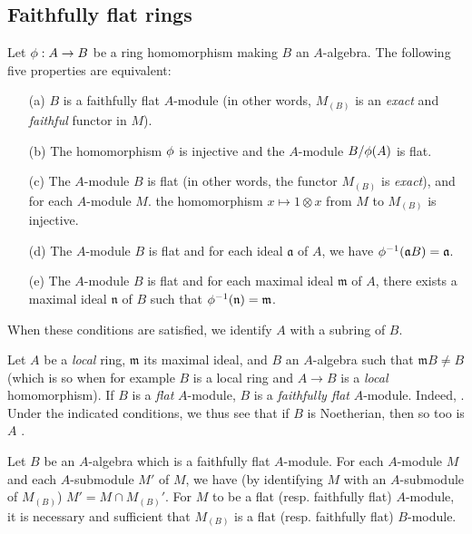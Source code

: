 \subsection{Faithfully flat rings}
\label{subsection:0.6.6}

\begin{env}[6.6.1]
\label{0.6.6.1}
Let $\vphi:A\to B$ be a ring homomorphism making $B$ an $A$-algebra. The following five
properties are equivalent:
\begin{enumerate}
  \item[(a)] $B$ is a faithfully flat $A$-module (in other words, $M_{(B)}$ is an \emph{exact}
    and \emph{faithful} functor in $M$).
  \item[(b)] The homomorphism $\phi$ is injective and the $A$-module $B/\phi(A)$ is flat.
  \item[(c)] The $A$-module $B$ is flat (in other words, the functor $M_{(B)}$ is \emph{exact}),
    and for each $A$-module $M$. the homomorphism $x\mapsto 1\otimes x$ from $M$ to $M_{(B)}$ is
    injective.
  \item[(d)] The $A$-module $B$ is flat and for each ideal $\mathfrak{a}$ of $A$, we have
    $\phi^{-1}(\mathfrak{a}B)=\mathfrak{a}$.
  \item[(e)] The $A$-module $B$ is flat and for each maximal ideal $\mathfrak{m}$ of $A$, there
    exists a maximal ideal $\mathfrak{n}$ of $B$ such that $\phi^{-1}(\mathfrak{n})=\mathfrak{m}$.
\end{enumerate}

When these conditions are satisfied, we identify $A$ with a subring of $B$.
\end{env}

\begin{env}[6.6.2]
\label{0.6.6.2}
Let $A$ be a \emph{local} ring, $\mathfrak{m}$ its maximal ideal, and $B$ an $A$-algebra such
that $\mathfrak{m}B\neq B$ (which is so when for example $B$ is a local ring and $A\to B$ is
a \emph{local} homomorphism). If $B$ is a \emph{flat} $A$-module, $B$ is a \emph{faithfully
flat} $A$-module.
Indeed, .
Under the indicated conditions, we thus see that if $B$ is Noetherian, then so too is $A$ .
\end{env}

\begin{env}[6.6.3]
\label{0.6.6.3}
Let $B$ be an $A$-algebra which is a faithfully flat $A$-module. For each $A$-module $M$ and
each $A$-submodule $M'$ of $M$, we have (by identifying $M$ with an $A$-submodule of
$M_{(B)}$) $M'=M\cap M_{(B)}'$. For $M$ to be a flat (resp. faithfully flat) $A$-module, it
is necessary and sufficient that $M_{(B)}$ is a flat (resp. faithfully flat) $B$-module.
\end{env}

